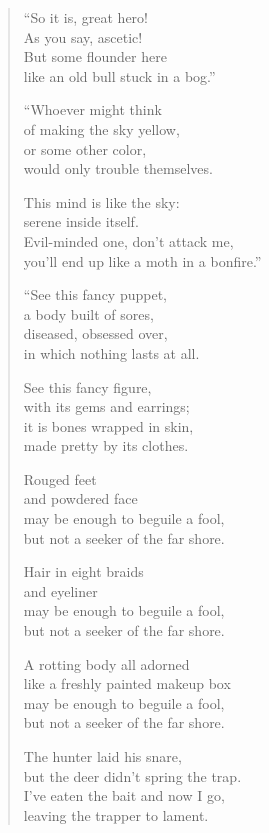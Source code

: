 \documentclass[12pt,openany]{book}%
\begin{document}
\begin{verse}
“So it is, great hero! \\
As you say, ascetic! \\
But some flounder here \\
like an old bull stuck in a bog.” 

“Whoever might think \\
of making the sky yellow, \\
or some other color, \\
would only trouble themselves. 

This mind is like the sky: \\
serene inside itself. \\
Evil-minded one, don’t attack me, \\
you’ll end up like a moth in a bonfire.” 

“See this fancy puppet, \\
a body built of sores, \\
diseased, obsessed over, \\
in which nothing lasts at all. 

See this fancy figure, \\
with its gems and earrings; \\
it is bones wrapped in skin, \\
made pretty by its clothes. 

Rouged feet \\
and powdered face \\
may be enough to beguile a fool, \\
but not a seeker of the far shore. 

Hair in eight braids \\
and eyeliner \\
may be enough to beguile a fool, \\
but not a seeker of the far shore. 

A rotting body all adorned \\
like a freshly painted makeup box \\
may be enough to beguile a fool, \\
but not a seeker of the far shore. 

The hunter laid his snare, \\
but the deer didn’t spring the trap. \\
I’ve eaten the bait and now I go, \\
leaving the trapper to lament. 


\end{verse}
\end{document}
